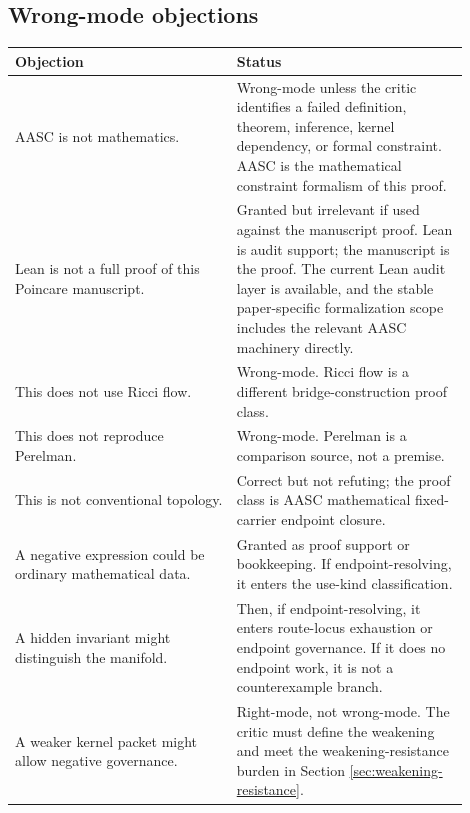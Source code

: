 \documentclass[11pt]{article}
\begin{document}
\subsection{Wrong-mode objections}
\begin{longtable}{L{0.44\linewidth}L{0.46\linewidth}}
\toprule
\textbf{Objection} & \textbf{Status}\\
\midrule
AASC is not mathematics. & Wrong-mode unless the critic identifies a failed definition, theorem, inference, kernel dependency, or formal constraint. AASC is the mathematical constraint formalism of this proof.\\
Lean is not a full proof of this Poincare manuscript. & Granted but irrelevant if used against the manuscript proof. Lean is audit support; the manuscript is the proof. The current Lean audit layer is available, and the stable paper-specific formalization scope includes the relevant AASC machinery directly.\\
This does not use Ricci flow. & Wrong-mode. Ricci flow is a different bridge-construction proof class.\\
This does not reproduce Perelman. & Wrong-mode. Perelman is a comparison source, not a premise.\\
This is not conventional topology. & Correct but not refuting; the proof class is AASC mathematical fixed-carrier endpoint closure.\\
A negative expression could be ordinary mathematical data. & Granted as proof support or bookkeeping. If endpoint-resolving, it enters the use-kind classification.\\
A hidden invariant might distinguish the manifold. & Then, if endpoint-resolving, it enters route-locus exhaustion or endpoint governance. If it does no endpoint work, it is not a counterexample branch.\\
A weaker kernel packet might allow negative governance. & Right-mode, not wrong-mode. The critic must define the weakening and meet the weakening-resistance burden in Section \ref{sec:weakening-resistance}.\\
\bottomrule
\end{longtable}
\end{document}
